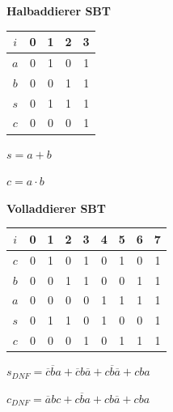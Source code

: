 \documentclass[11pt,a4paper]{scrreprt}
\begin{document}
\begin{minipage}[t]{0.5\textwidth} \vspace{0mm} \centering
	\textbf{Halbaddierer SBT}
	
	\begin{tabular}{c*{4}{c}}
		$i$ & 0 & 1 & 2 & 3 \\ \hline
		$a$ & 0 & 1 & 0 & 1 \\
		$b$ & 0 & 0 & 1 & 1 \\ \hline
		$s$ & 0 & 1 & 1 & 1 \\ \hline
		$c$ & 0 & 0 & 0 & 1 \\
	\end{tabular}
	
	$s = a + b$
	
	$c = a \cdot b $
\end{minipage}
\begin{minipage}[t]{0.5\textwidth} \vspace{0mm} \centering
	\textbf{Volladdierer SBT}
	
	\begin{tabular}{c*{8}{c}}
		$i$ & 0 & 1 & 2 & 3 & 4 & 5 & 6 & 7 \\ \hline
		$c$ & 0 & 1 & 0 & 1 & 0 & 1 & 0 & 1 \\
		$b$ & 0 & 0 & 1 & 1 & 0 & 0 & 1 & 1 \\
		$a$ & 0 & 0 & 0 & 0 & 1 & 1 & 1 & 1 \\ \hline
		$s$ & 0 & 1 & 1 & 0 & 1 & 0 & 0 & 1 \\ \hline
		$c$ & 0 & 0 & 0 & 1 & 0 & 1 & 1 & 1 \\
	\end{tabular}
	
	$s_{\textit{DNF}} = \overline{c}\overline{b}a
		+ \overline{c}b\overline{a} 
		+ c\overline{b}\overline{a}
		+ cba$
	
	$c_{\textit{DNF}} = \overline{a}bc
		+ c\overline{b}a 
		+ cb\overline{a}
		+ cba$
\end{minipage}



%
\end{document}

